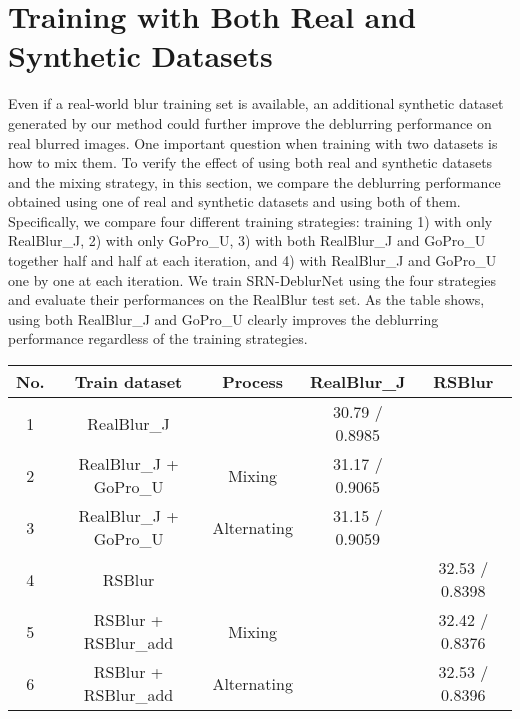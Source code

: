 \section{Training with Both Real and Synthetic Datasets}


Even if a real-world blur training set is available, an additional synthetic dataset generated by our method could further improve the deblurring performance on real blurred images.
One important question when training with two datasets is how to mix them.
To verify the effect of using both real and synthetic datasets and the mixing strategy, in this section, we compare the deblurring performance obtained using one of real and synthetic datasets and using both of them.
Specifically, we compare four different training strategies: training 1) with only RealBlur\_J, 2) with only GoPro\_U, 3) with both RealBlur\_J and GoPro\_U together half and half at each iteration, and 4) with RealBlur\_J and GoPro\_U one by one at each iteration.
We train SRN-DeblurNet using the four strategies and evaluate their performances on the RealBlur test set.
As the table shows, using both RealBlur\_J and GoPro\_U clearly improves the deblurring performance regardless of the training strategies.


\setlength{\tabcolsep}{5pt}
\begin{table}[t]
\centering
\caption{Comparison of different training strategies using additional synthetic datasets for further performance improvements.}
\label{tbl:training_process}
\end{table}

\begin{tabular}{|c|cc|cc|}
\hline
No. & Train dataset          & Process     & RealBlur\_J    & RSBlur         \\ \hline
1   & RealBlur\_J            &             & 30.79 / 0.8985 &                \\
2   & RealBlur\_J + GoPro\_U & Mixing      & 31.17 / 0.9065 &                \\
3   & RealBlur\_J + GoPro\_U & Alternating & 31.15 / 0.9059 &                \\ \hline
4   & RSBlur                 &             &                & 32.53 / 0.8398 \\
5   & RSBlur + RSBlur\_add   & Mixing      &                & 32.42 / 0.8376 \\
6   & RSBlur + RSBlur\_add   & Alternating &                & 32.53 / 0.8396 \\ \hline
\end{tabular}
\fi


